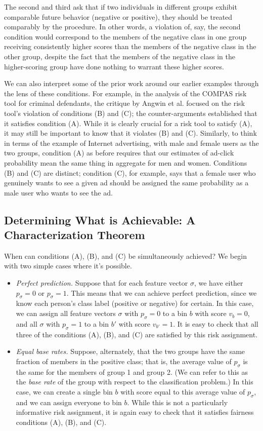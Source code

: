 \documentclass[11pt]{article}
\begin{document}
The second and third ask that if two individuals in different groups
exhibit comparable future behavior (negative or positive),
they should be treated comparably by the procedure.
In other words, a violation of, say, the second condition would
correspond to the members of the negative class in one group receiving
consistently higher scores than the members of the negative class
in the other group, despite the fact that the members of the negative
class in the higher-scoring group have done nothing to warrant
these higher scores.

We can also interpret some of the prior work around our earlier examples
through the lens of these conditions.
For example, in the analysis of the COMPAS risk tool for criminal
defendants, the critique by Angwin et al. focused on the risk tool's
violation of conditions (B) and (C); the counter-arguments 
established that it satisfies condition (A).
While it is clearly crucial for a risk tool to satisfy (A), 
it may still be important to know that it violates (B) and (C).
Similarly, to think in terms of the example of Internet advertising,
with male and female users as the two groups, 
condition (A) as before requires that our estimates of ad-click probability
mean the same thing in aggregate for men and women.
Conditions (B) and (C) are distinct; condition (C), for example, says
that a female user who genuinely wants to see a given ad should be
assigned the same probability as a male user who wants to see the ad.

\subsection{Determining What is Achievable: A Characterization Theorem}

When can conditions (A), (B), and (C) be simultaneously achieved?
We begin with two simple cases where it's possible.

\begin{itemize}
\item {\em Perfect prediction.} Suppose that for each feature vector
$\sigma$, we have either $p_\sigma = 0$ or $p_\sigma = 1$.
This means that we can achieve perfect prediction, since we know
each person's class label (positive or negative) for certain.
In this case, we can assign all feature vectors $\sigma$ with $p_\sigma = 0$
to a bin $b$ with score $v_b = 0$, and all $\sigma$ with $p_\sigma = 1$
to a bin $b'$ with score $v_{b'} = 1$.
It is easy to check that all three of the conditions (A), (B), and (C)
are satisfied by this risk assignment.
\item {\em Equal base rates.} Suppose, alternately, that
the two groups have the same fraction of members in the positive class;
that is, the average value of $p_\sigma$
is the same for the members of group 1 and group 2.
(We can refer to this as the {\em base rate} of the group
with respect to the classification problem.)
In this case, we can create a single bin $b$ with score equal
to this average value of $p_\sigma$, and we can assign everyone to bin $b$.
While this is not a particularly informative risk assignment,
it is again
easy to check that it satisfies fairness conditions (A), (B), and (C).
\end{itemize}
\end{document}
